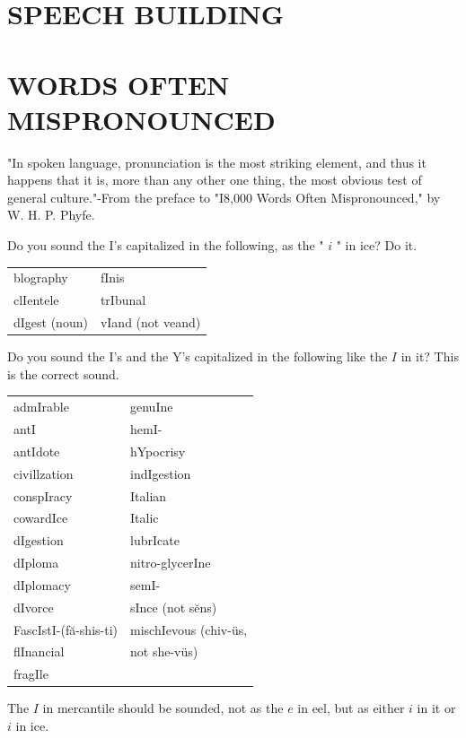 \documentclass[10pt]{article}
\begin{document}
\section*{SPEECH BUILDING}
\section*{WORDS OFTEN MISPRONOUNCED}
"In spoken language, pronunciation is the most striking element, and thus it happens that it is, more than any other one thing, the most obvious test of general culture."-From the preface to "I8,000 Words Often Mispronounced," by W. H. P. Phyfe.

Do you sound the I's capitalized in the following, as the " $i$ " in ice? Do it.

\begin{center}
\begin{tabular}{ll}
blography & fInis \\
clIentele & trIbunal \\
dIgest (noun) & vIand (not veand) \\
\end{tabular}
\end{center}

Do you sound the I's and the Y's capitalized in the following like the $I$ in it? This is the correct sound.

\begin{center}
\begin{tabular}{ll}
admIrable & genuIne \\
antI & hemI- \\
antIdote & hYpocrisy \\
civillzation & indIgestion \\
conspIracy & Italian \\
cowardIce & Italic \\
dIgestion & lubrIcate \\
dIploma & nitro-glycerIne \\
dIplomacy & semI- \\
dIvorce & sInce (not sĕns) \\
FascIstI-(fă-shis-ti) & mischIevous (chiv-üs, \\
flInancial & not she-vüs) \\
fragIle &  \\
\end{tabular}
\end{center}

The $I$ in mercantile should be sounded, not as the $e$ in eel, but as either $i$ in it or $i$ in ice.
\end{document}

